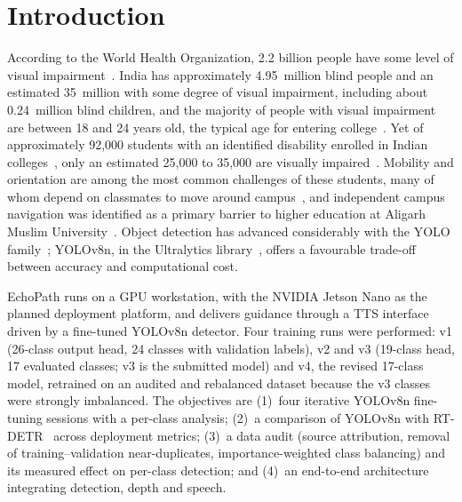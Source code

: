 \documentclass[3p,times,procedia]{elsarticle}
\DeclareRobustCommand{\rev}[1]{{\hlattr=1 #1}}
\DeclareRobustCommand{\rev}[1]{\hl{#1}}
\DeclareRobustCommand{\rev}[1]{#1}
\begin{document}
\vspace*{-6pt}

\section{Introduction}
\label{sec:intro}

According to the World Health Organization, 2.2 billion people have some
level of visual impairment~\cite{who2023}. India has approximately
4.95~million blind people and an estimated 35~million with some degree of
visual impairment, including about 0.24~million blind children, and the
majority of people with visual impairment are between 18 and 24 years old,
the typical age for entering college~\cite{singh2022}. Yet of approximately
92,000 students with an identified disability enrolled in Indian
colleges~\cite{aishe2021}, only an estimated 25,000 to 35,000 are visually
impaired~\cite{aishe2019,aishe_impaired_data}. Mobility and orientation are
among the most common challenges of these students, many of whom depend on
classmates to move around campus~\cite{at2030}, and independent campus
navigation was identified as a primary barrier to higher education at
Aligarh Muslim University~\cite{abdul2023}. Object detection has advanced
considerably with the YOLO family~\cite{redmon2016yolo}; YOLOv8n, in the
Ultralytics library~\cite{jocher2023yolov8}, offers a favourable trade-off
between accuracy and computational cost.

EchoPath runs on a GPU workstation, with the NVIDIA Jetson Nano as the
planned deployment platform, and delivers guidance through a TTS interface
driven by a fine-tuned YOLOv8n detector. \rev{Four training runs were
performed: v1 (26-class output head, 24 classes with validation labels), v2
and v3 (19-class head, 17 evaluated classes; v3 is the submitted model)} and
v4, the revised 17-class model, retrained on an audited and rebalanced
dataset because the v3 classes were strongly imbalanced. The objectives
are (1)~four iterative YOLOv8n fine-tuning sessions with a per-class
analysis; (2)~a comparison of YOLOv8n with RT-DETR~\cite{zhao2023rtdetr}
across deployment metrics; (3)~a data audit (source attribution,
removal of training--validation near-duplicates, importance-weighted class
balancing) and its measured effect on per-class detection; and (4)~an
end-to-end architecture integrating detection, depth and speech.
\end{document}

